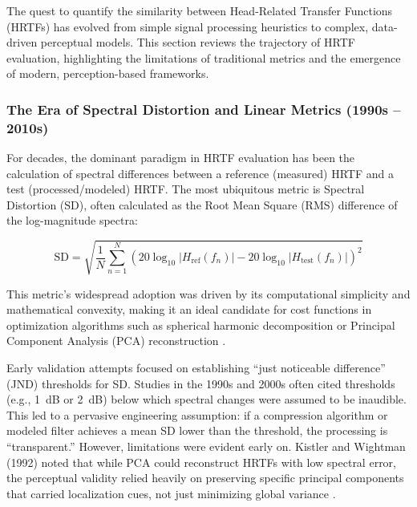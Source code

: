 \documentclass[12pt,a4paper]{article}
\begin{document}
The quest to quantify the similarity between Head-Related Transfer Functions (HRTFs) has evolved from simple signal processing heuristics to complex, data-driven perceptual models. This section reviews the trajectory of HRTF evaluation, highlighting the limitations of traditional metrics and the emergence of modern, perception-based frameworks.

\subsubsection{The Era of Spectral Distortion and Linear Metrics (1990s -- 2010s)}

For decades, the dominant paradigm in HRTF evaluation has been the calculation of spectral differences between a reference (measured) HRTF and a test (processed/modeled) HRTF. The most ubiquitous metric is Spectral Distortion (SD), often calculated as the Root Mean Square (RMS) difference of the log-magnitude spectra:

\begin{equation}
\mathrm{SD} = \sqrt{\frac{1}{N} \sum_{n=1}^{N} \left( 20 \log_{10} |H_{\mathrm{ref}}(f_n)| - 20 \log_{10} |H_{\mathrm{test}}(f_n)| \right)^2}
\label{eq:sd}
\end{equation}

This metric's widespread adoption was driven by its computational simplicity and mathematical convexity, making it an ideal candidate for cost functions in optimization algorithms such as spherical harmonic decomposition or Principal Component Analysis (PCA) reconstruction \cite{asaudio2025}.

Early validation attempts focused on establishing ``just noticeable difference'' (JND) thresholds for SD. Studies in the 1990s and 2000s often cited thresholds (e.g., 1~dB or 2~dB) below which spectral changes were assumed to be inaudible. This led to a pervasive engineering assumption: if a compression algorithm or modeled filter achieves a mean SD lower than the threshold, the processing is ``transparent.'' However, limitations were evident early on. Kistler and Wightman (1992) noted that while PCA could reconstruct HRTFs with low spectral error, the perceptual validity relied heavily on preserving specific principal components that carried localization cues, not just minimizing global variance \cite{kistler1992}.
\end{document}
